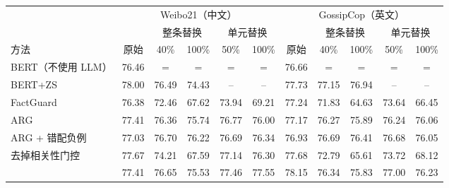 \begin{tabular}{lcccccccccc}
\toprule
 & \multicolumn{5}{c}{Weibo21（中文）} & \multicolumn{5}{c}{GossipCop（英文）} \\
\cmidrule(lr){2-6}\cmidrule(lr){7-11}
 & & \multicolumn{2}{c}{整条替换} & \multicolumn{2}{c}{单元替换} & & \multicolumn{2}{c}{整条替换} & \multicolumn{2}{c}{单元替换} \\
\cmidrule(lr){3-4}\cmidrule(lr){5-6}\cmidrule(lr){8-9}\cmidrule(lr){10-11}
方法 & 原始 & 40\% & 100\% & 50\% & 100\% & 原始 & 40\% & 100\% & 50\% & 100\% \\
\midrule
BERT（不使用 LLM） & 76.46 & $=$ & $=$ & $=$ & $=$ & 76.66 & $=$ & $=$ & $=$ & $=$ \\
BERT+ZS & 78.00 & 76.49 & 74.43 & -- & -- & 77.73 & 77.15 & 76.94 & -- & -- \\
FactGuard & 76.38 & 72.46 & 67.62 & 73.94 & 69.21 & 77.24 & 71.83 & 64.63 & 73.64 & 66.45 \\
ARG & 77.41 & 76.36 & 75.74 & 76.77 & 76.00 & 77.17 & 76.27 & 75.89 & 76.24 & 76.06 \\
ARG + 错配负例 & 77.03 & 76.70 & 76.22 & 76.69 & 76.34 & 76.93 & 76.69 & 76.41 & 76.68 & 76.05 \\
\method{} 去掉相关性门控 & 77.67 & 74.21 & 67.59 & 77.14 & 76.30 & 77.68 & 72.79 & 65.61 & 73.72 & 68.12 \\
\method{} & 77.41 & 76.65 & 75.53 & 77.46 & 77.55 & 78.15 & 76.34 & 75.83 & 77.00 & 76.23 \\
\bottomrule
\end{tabular}
